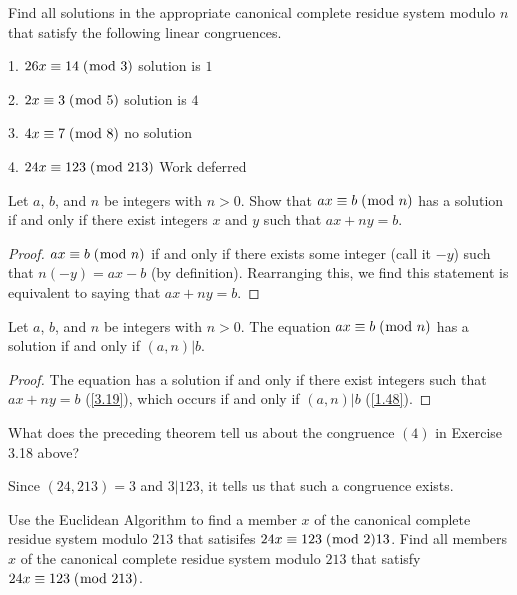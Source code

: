 \documentclass[../main.tex]{subfiles}
\begin{document}
\begin{ex} \label{3.18}
  Find all solutions in the appropriate canonical complete residue system modulo $n$ that satisfy the following linear congruences.
\end{ex}

1. $26x \equiv 14 \; (\bmod \; 3)$ solution is $1$

2. $2x \equiv 3 \; (\bmod \; 5)$ solution is $4$

3. $4x \equiv 7 \; (\bmod \; 8)$ no solution

4. $24x \equiv 123 \; (\bmod \; 213)$ Work deferred



\begin{thm} \label{3.19}
  Let $a$, $b$, and $n$ be integers with $n > 0$. Show that $ax \equiv b \; (\bmod \; n)$ has a solution if and only if there exist integers $x$ and $y$ such that $ax + ny = b$.
\end{thm}

\begin{proof}
  $ax \equiv b \; (\bmod \; n)$ if and only if there exists some integer (call it $-y$) such that $n(-y) = ax - b$ (by definition). Rearranging this, we find this statement is equivalent to saying that $ax + ny = b$.
\end{proof}



\begin{thm} \label{3.20}
  Let $a$, $b$, and $n$ be integers with $n > 0$. The equation $ax \equiv b \; (\bmod \; n)$ has a solution if and only if $(a, n) | b$.
\end{thm}

\begin{proof}
  The equation has a solution if and only if there exist integers such that $ax + ny = b$ (\ref{3.19}), which occurs if and only if $(a, n) | b$ (\ref{1.48}).
\end{proof}



\begin{ques} \label{3.21}
  What does the preceding theorem tell us about the congruence $(4)$ in Exercise 3.18 above?
\end{ques}

Since $(24, 213) = 3$ and $3 | 123$, it tells us that such a congruence exists.



\begin{ex} \label{3.22}
  Use the Euclidean Algorithm to find a member $x$ of the canonical complete residue system modulo $213$ that satisifes $24x \equiv 123 \; (\bmod \; 2)13$. Find all members $x$ of the canonical complete residue system modulo $213$ that satisfy $24x \equiv 123 \; (\bmod \; 213)$.
\end{ex}
\end{document}
